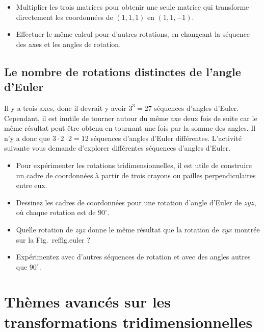 \begin{framed}
\begin{itemize}
\item Multiplier les trois matrices pour obtenir une seule matrice qui transforme directement les coordonnées de $(1,1,1)$ en $(1,1,-1)$.
\item Effectuer le même calcul pour d'autres rotations, en changeant la séquence des axes et les angles de rotation.
\end{itemize}
\end{framed}

\subsection{Le nombre de rotations distinctes de l'angle d'Euler}

Il y a trois axes, donc il devrait y avoir $3^3=27$ séquences d'angles d'Euler. Cependant, il est inutile de tourner autour du même axe deux fois de suite car le même résultat peut être obtenu en tournant une fois par la somme des angles. Il n'y a donc que $3\cdot 2\cdot 2=12$ séquences d'angles d'Euler différentes.  L'activité suivante vous demande d'explorer différentes séquences d'angles d'Euler.

\begin{framed}
\begin{itemize}
\item Pour expérimenter les rotations tridimensionnelles, il est utile de construire un cadre de coordonnées à partir de trois crayons ou pailles perpendiculaires entre eux.
\item Dessinez les cadres de coordonnées pour une rotation d'angle d'Euler de $zyz$, où chaque rotation est de $90^\circ$. %
\item Quelle rotation de $zyz$ donne le même résultat que la rotation de $zyx$ montrée sur la Fig.~ref{fig.euler} ? %
\item Expérimentez avec d'autres séquences de rotation et avec des angles autres que $90^\circ$.
\end{itemize}
\end{framed}

\section[Les transformations tridimensionnelles]{Thèmes avancés sur les transformations tridimensionnelles}\label{s.advanced-three}

